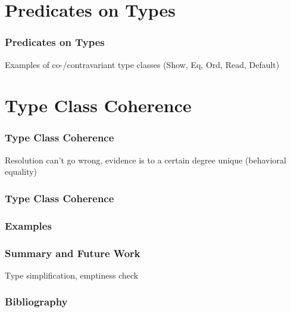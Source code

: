 \documentclass{beamer}
\begin{document}
\section{Predicates on Types}

\begin{frame}
    \frametitle{Predicates on Types}
    Examples of co-/contravariant type classes (Show, Eq, Ord, Read, Default)
\end{frame}

\section{Type Class Coherence}

\begin{frame}
    \frametitle{Type Class Coherence}

    Resolution can't go wrong, evidence is to a certain degree unique (behavioral equality)
\end{frame}

\begin{frame}
  \frametitle{Type Class Coherence}


\end{frame}

\begin{frame}
    \frametitle{Examples}
\end{frame}

\begin{frame}
    \frametitle{Summary and Future Work}
    Type simplification, emptiness check

\end{frame}

\begin{frame}
    \frametitle{Bibliography}
    
    
\end{frame}
\end{document}

